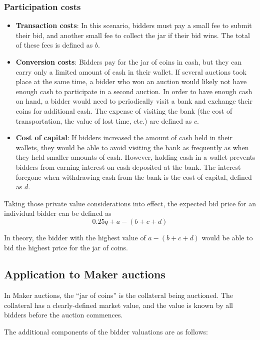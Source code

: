 \documentclass[conference]{IEEEtran}
\begin{document}
\subsubsection{Participation costs} 
\begin{itemize}[leftmargin=.4in]
    \item \textbf{Transaction costs}: In this scenario, bidders must pay a small fee to submit their bid, and another small fee to collect the jar if their bid wins. The total of these fees is defined as $b$.
    \item \textbf{Conversion costs}: Bidders pay for the jar of coins in cash, but they can carry only a limited amount of cash in their wallet. If several auctions took place at the same time, a bidder who won an auction would likely not have enough cash to participate in a second auction. In order to have enough cash on hand, a bidder would need to periodically visit a bank and exchange their coins for additional cash. The expense of visiting the bank (the cost of transportation, the value of lost time, etc.) are defined as $c$.
    \item \textbf{Cost of capital}: If bidders increased the amount of cash held in their wallets, they would be able to avoid visiting the bank as frequently as when they held smaller amounts of cash. However, holding cash in a wallet prevents bidders from earning interest on cash deposited at the bank. The interest foregone when withdrawing cash from the bank is the cost of capital, defined as $d$.
\end{itemize}

Taking those private value considerations into effect, the expected bid price for an individual bidder can be defined as
\begin{equation}
\label{eq:coins}
    0.25q + a - (b + c + d)
\end{equation}

In theory, the bidder with the highest value of $a - (b + c + d)$ would be able to bid the highest price for the jar of coins.

\subsection{Application to Maker auctions}
In Maker auctions, the ``jar of coins'' is the collateral being auctioned. The collateral has a clearly-defined market value, and the value is known by all bidders before the auction commences. 

The additional components of the bidder valuations are as follows:
\end{document}
